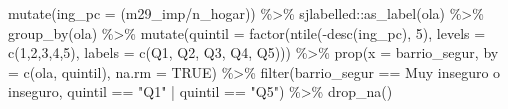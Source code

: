 \documentclass[
  12pt,
]{book}
\newenvironment{Shaded}{\begin{snugshade}}{\end{snugshade}}
\newcommand{\AttributeTok}[1]{\textcolor[rgb]{0.77,0.63,0.00}{#1}}
\newcommand{\ConstantTok}[1]{\textcolor[rgb]{0.00,0.00,0.00}{#1}}
\newcommand{\DecValTok}[1]{\textcolor[rgb]{0.00,0.00,0.81}{#1}}
\newcommand{\FunctionTok}[1]{\textcolor[rgb]{0.00,0.00,0.00}{#1}}
\newcommand{\NormalTok}[1]{#1}
\newcommand{\SpecialCharTok}[1]{\textcolor[rgb]{0.00,0.00,0.00}{#1}}
\newcommand{\StringTok}[1]{\textcolor[rgb]{0.31,0.60,0.02}{#1}}
\begin{document}
\begin{Shaded}
\begin{Highlighting}[]
  \FunctionTok{mutate}\NormalTok{(}\AttributeTok{ing\_pc =}\NormalTok{ (m29\_imp}\SpecialCharTok{/}\NormalTok{n\_hogar)) }\SpecialCharTok{\%\textgreater{}\%}
\NormalTok{  sjlabelled}\SpecialCharTok{::}\FunctionTok{as\_label}\NormalTok{(ola) }\SpecialCharTok{\%\textgreater{}\%} 
  \FunctionTok{group\_by}\NormalTok{(ola) }\SpecialCharTok{\%\textgreater{}\%} 
  \FunctionTok{mutate}\NormalTok{(}\AttributeTok{quintil =} \FunctionTok{factor}\NormalTok{(}\FunctionTok{ntile}\NormalTok{(}\SpecialCharTok{{-}}\FunctionTok{desc}\NormalTok{(ing\_pc), }\DecValTok{5}\NormalTok{), }\AttributeTok{levels =} \FunctionTok{c}\NormalTok{(}\DecValTok{1}\NormalTok{,}\DecValTok{2}\NormalTok{,}\DecValTok{3}\NormalTok{,}\DecValTok{4}\NormalTok{,}\DecValTok{5}\NormalTok{),}
         \AttributeTok{labels =} \FunctionTok{c}\NormalTok{(}\StringTok{\textquotesingle{}Q1\textquotesingle{}}\NormalTok{, }\StringTok{\textquotesingle{}Q2\textquotesingle{}}\NormalTok{, }\StringTok{\textquotesingle{}Q3\textquotesingle{}}\NormalTok{, }\StringTok{\textquotesingle{}Q4\textquotesingle{}}\NormalTok{, }\StringTok{\textquotesingle{}Q5\textquotesingle{}}\NormalTok{))) }\SpecialCharTok{\%\textgreater{}\%} 
  \FunctionTok{prop}\NormalTok{(}\AttributeTok{x =}\NormalTok{ barrio\_segur, }\AttributeTok{by =} \FunctionTok{c}\NormalTok{(ola, quintil), }\AttributeTok{na.rm =} \ConstantTok{TRUE}\NormalTok{) }\SpecialCharTok{\%\textgreater{}\%} 
  \FunctionTok{filter}\NormalTok{(barrio\_segur }\SpecialCharTok{==} \StringTok{\textquotesingle{}Muy inseguro o inseguro\textquotesingle{}}\NormalTok{, quintil }\SpecialCharTok{==} \StringTok{"Q1"} \SpecialCharTok{|}\NormalTok{ quintil }\SpecialCharTok{==} \StringTok{"Q5"}\NormalTok{) }\SpecialCharTok{\%\textgreater{}\%} 
  \FunctionTok{drop\_na}\NormalTok{()}


\end{Highlighting}
\end{Shaded}
\end{document}

